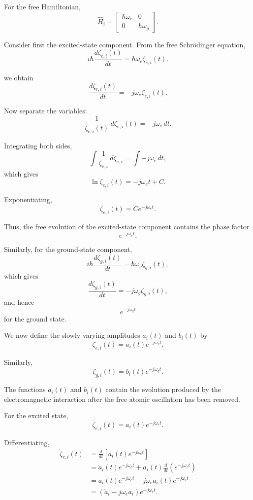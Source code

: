 \documentclass[12pt,a4paper]{article}
\begin{document}
For the free Hamiltonian,
\[
\hat H_i
=
\begin{bmatrix}
\hbar\omega_e & 0\\
0 & \hbar\omega_g
\end{bmatrix}.
\]

Consider first the excited-state component. From the free
Schr\"odinger equation,
\[
i\hbar
\frac{d\zeta_{e,i}(t)}{dt}
=
\hbar\omega_e\zeta_{e,i}(t).
\]

we obtain
\[
\frac{d\zeta_{e,i}(t)}{dt}
=
-j\omega_e\zeta_{e,i}(t).
\]

Now separate the variables:
\[
\frac{1}{\zeta_{e,i}(t)}
\,d\zeta_{e,i}(t)
=
-j\omega_e\,dt.
\]

Integrating both sides,
\[
\int
\frac{1}{\zeta_{e,i}}
\,d\zeta_{e,i}
=
\int
-j\omega_e\,dt,
\]
which gives
\[
\ln\zeta_{e,i}(t)
=
-j\omega_e t+C.
\]

Exponentiating,
\[
\zeta_{e,i}(t)
=
Ce^{-j\omega_e t}.
\]

Thus, the free evolution of the excited-state component contains
the phase factor
\[
\boxed{
e^{-j\omega_e t}
}.
\]

Similarly, for the ground-state component,
\[
i\hbar
\frac{d\zeta_{g,i}(t)}{dt}
=
\hbar\omega_g\zeta_{g,i}(t),
\]
which gives
\[
\frac{d\zeta_{g,i}(t)}{dt}
=
-j\omega_g\zeta_{g,i}(t),
\]
and hence
\[
\boxed{
e^{-j\omega_g t}
}
\]
for the ground state.

We now define the slowly varying amplitudes \(a_i(t)\) and
\(b_i(t)\) by
\begin{equation}
\boxed{
\zeta_{e,i}(t)
=
a_i(t)e^{-j\omega_e t}.
}
\tag{29a}
\end{equation}

Similarly,
\begin{equation}
\boxed{
\zeta_{g,i}(t)
=
b_i(t)e^{-j\omega_g t}.
}
\tag{29b}
\end{equation}

The functions \(a_i(t)\) and \(b_i(t)\) contain the evolution
produced by the electromagnetic interaction after the free atomic
oscillation has been removed.

For the excited state,
\[
\zeta_{e,i}(t)
=
a_i(t)e^{-j\omega_e t}.
\]

Differentiating,
\[
\begin{aligned}
\dot{\zeta}_{e,i}(t)
&=
\frac{d}{dt}
\left[
a_i(t)e^{-j\omega_e t}
\right]\\
&=
\dot a_i(t)e^{-j\omega_e t}
+
a_i(t)
\frac{d}{dt}
\left(
e^{-j\omega_e t}
\right)\\
&=
\dot a_i(t)e^{-j\omega_e t}
-
j\omega_ea_i(t)e^{-j\omega_e t}\\
&=
\left(
\dot a_i-j\omega_ea_i
\right)
e^{-j\omega_e t}.
\end{aligned}
\]
\end{document}

